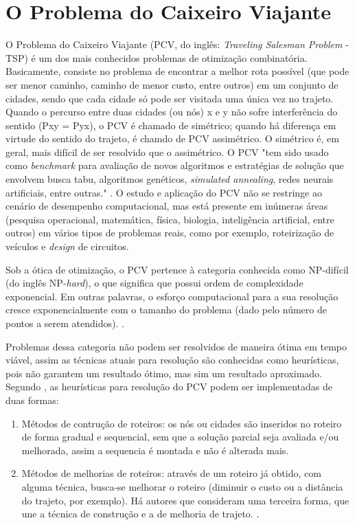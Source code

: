 \section{O Problema do Caixeiro Viajante}
\label{secao:caixeiro_viajante}

O Problema do Caixeiro Viajante (PCV, do inglês: \textit{Traveling Salesman Problem} - TSP) é um dos mais conhecidos problemas de otimização combinatória. Basicamente, consiste no problema de encontrar a melhor rota possível (que pode ser menor caminho, caminho de menor custo, entre outros) em um conjunto de cidades, sendo que cada cidade só pode ser visitada uma única vez no trajeto. Quando o percurso entre duas cidades (ou nós) x e y não sofre interferência do sentido (Pxy = Pyx), o PCV é chamado de simétrico; quando há diferença em virtude do sentido do trajeto, é chamdo de PCV assimétrico. O simétrico é, em geral, mais difícil de ser resolvido que o assimétrico. O PCV "tem sido usado como \textit{benchmark} para avaliação de novos algoritmos e estratégias de solução que envolvem busca tabu, algoritmos genéticos, \textit{simulated annealing}, redes neurais artificiais, entre outras." \cite{cunha:2002:experimentos}. O estudo e aplicação do PCV não se restringe ao cenário de desempenho computacional, mas está presente em inúmeras áreas (pesquisa operacional, matemática, física, biologia, inteligência artificial, entre outros) em vários tipos de problemas reais, como por exemplo, roteirização de veículos e \textit{design} de circuitos.

\begin{citacao}
	Sob a ótica de otimização, o PCV pertence à categoria conhecida como NP-difícil (do inglês NP-\textit{hard}), o que significa que possui ordem de complexidade exponencial. Em outras palavras, o esforço computacional para a sua resolução cresce exponencialmente com o tamanho do problema (dado pelo número de pontos a serem atendidos). \cite{cunha:2002:experimentos}.
\end{citacao}

Problemas dessa categoria não podem ser resolvidos de maneira ótima em tempo viável, assim as técnicas atuais para resolução são conhecidas como heurísticas, pois não garantem um resultado ótimo, mas sim um resultado aproximado. Segundo \citet{helsgaun:2000:effective}, as heurísticas para resolução do PCV podem ser implementadas de duas formas:

\begin{enumerate}
	\item Métodos de contrução de roteiros: os nós ou cidades são inseridos no roteiro de forma gradual e sequencial, sem que a solução parcial seja avaliada e/ou melhorada, assim a sequencia é montada e não é alterada mais.  
	
	\item Métodos de melhorias de roteiros: através de um roteiro já obtido, com alguma técnica, busca-se melhorar o roteiro (diminuir o custo ou a distância do trajeto, por exemplo). Há autores que consideram uma terceira forma, que une a técnica de construção e a de melhoria de trajeto. \cite{cunha:2002:experimentos}.
\end{enumerate}

